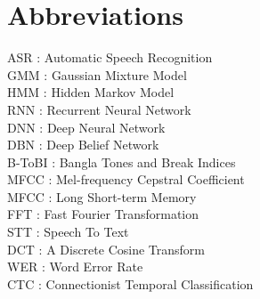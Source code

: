 \documentclass{standalone}
\begin{document}
\chapter*{Abbreviations}
ASR \hspace{12mm} : \hspace{5mm} Automatic Speech Recognition\\

GMM \hspace{10mm} : \hspace{5mm} Gaussian Mixture Model\\

HMM \hspace{10mm} : \hspace{5mm} Hidden Markov Model\\

RNN \hspace{11mm} : \hspace{6mm} Recurrent Neural Network\\

DNN \hspace{11mm} : \hspace{6mm} Deep Neural Network\\

DBN \hspace{11mm} : \hspace{6mm} Deep Belief Network\\

B-ToBI \hspace{8mm} : \hspace{6mm} Bangla Tones and Break Indices\\

MFCC \hspace{9mm} : \hspace{6mm} Mel-frequency Cepstral Coefficient\\

MFCC \hspace{9mm} : \hspace{6mm} Long Short-term Memory\\

FFT \hspace{14mm} : \hspace{5mm} Fast Fourier Transformation\\

STT \hspace{14mm} : \hspace{5mm} Speech To Text\\

DCT \hspace{14mm} : \hspace{5mm} A	
Discrete Cosine Transform\\

WER \hspace{14mm} : \hspace{4mm} Word Error Rate\\

CTC \hspace{14mm} : \hspace{4mm} Connectionist Temporal Classification\\
\end{document}

